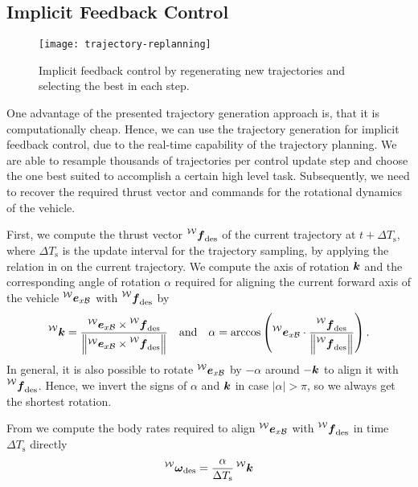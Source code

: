 \subsection{Implicit Feedback Control}
\label{sec:implicit-feedback-control}

\begin{figure}[h!]
	\centering
	\texttt{[image: trajectory-replanning]}
	\caption{Implicit feedback control by regenerating new trajectories and selecting the best in each step.}
\end{figure}

One advantage of the presented trajectory generation approach is, that it is computationally cheap. Hence, we can use the trajectory generation for implicit feedback control, due to the real-time capability of the trajectory planning. We are able to resample thousands of trajectories per control update step and choose the one best suited to accomplish a certain high level task.
Subsequently, we need to recover the required thrust vector and commands for the rotational dynamics of the vehicle.

First, we compute the thrust vector $\thrustdesiredworld$ of the current trajectory at $t+\Delta T_\text{s}$, where $\Delta T_{\text{s}}$ is the update interval for the trajectory sampling, by applying the relation in  on the current trajectory.
We compute the axis of rotation $\mbox{$\bm{k}$}$ and the corresponding angle of rotation $\alpha$ required for aligning the current forward axis of the vehicle $\prescript{\mathcal{W}}{}{\mbox{$\bm{e}$}}_{x\mathcal{B}}$ with $\thrustdesiredworld$ by
\begin{equation}
	\label{eq:rotation-to-desired-thrust-vector}
	\rotationaxisworld = \frac{
		\exbodyinworld \times \thrustdesiredworld
	}{
		\left\lVert
			\exbodyinworld \times \thrustdesiredworld
		\right\rVert}
	\quad
	\text{and}
	\quad
	\alpha = \arccos\left(
		\exbodyinworld \cdot
		\frac{\thrustdesiredworld}{\left\lVert\thrustdesiredworld\right\rVert}
	\right)
	.
\end{equation}
In general, it is also possible to rotate $\prescript{\mathcal{W}}{}{\mbox{$\bm{e}$}}_{x\mathcal{B}}$ by $-\alpha$ around $-\mbox{$\bm{k}$}$ to align it with $\thrustdesiredworld$. Hence, we invert the signs of $\alpha$ and $\mbox{$\bm{k}$}$ in case $\lvert\alpha\rvert > \pi$, so we always get the shortest rotation. 

From  we compute the body rates required to align $\prescript{\mathcal{W}}{}{\mbox{$\bm{e}$}}_{x\mathcal{B}}$ with $\thrustdesiredworld$ in time $\Delta T_{\text{s}}$ directly
\begin{equation}
	\vangdesiredworld = \frac{\alpha}{\Delta T_{\text{s}}} \rotationaxisworld
\end{equation}

